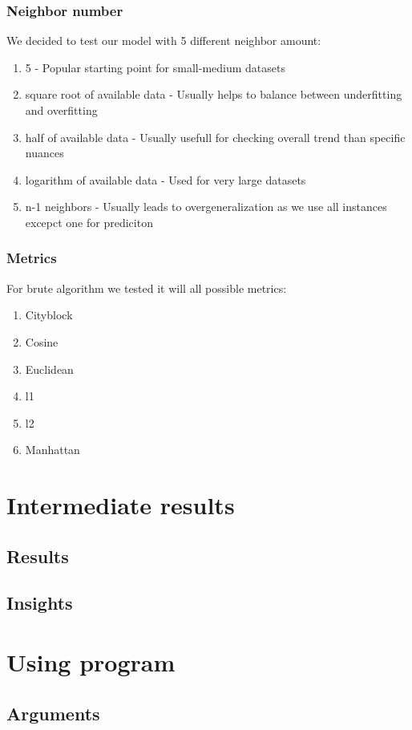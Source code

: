\documentclass[12pt]{article}
\begin{document}
\subsubsection{Neighbor number}
We decided to test our model with 5 different neighbor amount:
\begin{enumerate}
  \item 5 - Popular starting point for small-medium datasets
  \item square root of available data - Usually helps to balance between underfitting and overfitting
  \item half of available data - Usually usefull for checking overall trend than specific nuances 
  \item logarithm of available data - Used for very large datasets
  \item n-1 neighbors - Usually leads to overgeneralization as we use all instances excepct one for prediciton
\end{enumerate}

\subsubsection{Metrics}
For brute algorithm we tested it will all possible metrics:
\begin{enumerate}
  \item Cityblock
  \item Cosine
  \item Euclidean
  \item l1
  \item l2
  \item Manhattan 
\end{enumerate}

\section{Intermediate results}
\subsection{Results}
\subsection{Insights}

\section{Using program} 
  \subsection{Arguments}
\end{document}
